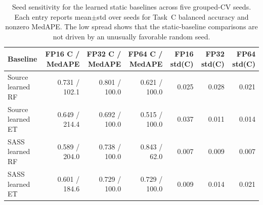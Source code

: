 \begin{table}[t]
  \centering
  \caption{Seed sensitivity for the learned static baselines across five grouped-CV seeds. Each entry reports mean$\pm$std over seeds for Task~C balanced accuracy and nonzero MedAPE. The low spread shows that the static-baseline comparisons are not driven by an unusually favorable random seed.}
  \label{tab:seed-sensitivity}
  \scriptsize
  \setlength{\tabcolsep}{4pt}
  \begin{tabular}{lrrrrrr}
    Baseline & FP16 C / MedAPE & FP32 C / MedAPE & FP64 C / MedAPE & FP16 std(C) & FP32 std(C) & FP64 std(C) \\
    \midrule
    Source learned RF & 0.731 / 102.1 & 0.801 / 100.0 & 0.621 / 100.0 & 0.025 & 0.028 & 0.021 \\
    Source learned ET & 0.649 / 214.4 & 0.692 / 100.0 & 0.515 / 100.0 & 0.037 & 0.011 & 0.014 \\
    SASS learned RF & 0.589 / 204.0 & 0.738 / 100.0 & 0.843 / 62.0 & 0.007 & 0.009 & 0.007 \\
    SASS learned ET & 0.601 / 184.6 & 0.729 / 100.0 & 0.729 / 100.0 & 0.009 & 0.014 & 0.021 \\
    \bottomrule
  \end{tabular}
\end{table}
